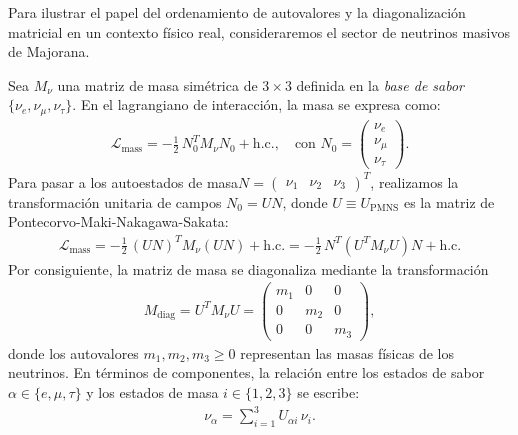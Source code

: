 \documentclass[12pt]{article}
\begin{document}
\newpage
\begin{cajaflex}

Para ilustrar el papel del ordenamiento de autovalores y la diagonalización 
matricial en un contexto físico real, 
consideraremos el sector de neutrinos masivos de Majorana. 

Sea $M_\nu$ una matriz de masa simétrica de $3 \times 3$ definida en la 
\textit{base de sabor} 
$ \{\nu_e, \nu_\mu, \nu_\tau\}$. 
En el lagrangiano de interacción, la masa se expresa como:
%
\begin{align*}
   \mathcal{L}_{\text{mass}} = -\frac{1}{2} \, N_0^T M_\nu N_0 + \text{h.c.}, \quad \text{con } 
   N_0 = \begin{pmatrix} \nu_e \\ \nu_\mu \\ \nu_\tau \end{pmatrix}.
\end{align*}
%
Para pasar a los autoestados de masa$N = \begin{pmatrix} \nu_1 & \nu_2 & \nu_3 \end{pmatrix}^T$,
realizamos la transformación unitaria de campos $N_0 = U N$, donde $U \equiv U_{\text{PMNS}}$ es la matriz de Pontecorvo-Maki-Nakagawa-Sakata:
%
\begin{align*}
   \mathcal{L}_{\text{mass}} = -\frac{1}{2} \, (U N)^T M_\nu (U N) + \text{h.c.} = -\frac{1}{2} \, N^T \left( U^T M_\nu U \right) N + \text{h.c.}
\end{align*}
%
Por consiguiente, la matriz de masa se diagonaliza mediante la transformación 
%
\begin{align*}
   M_{\text{diag}} = U^T M_\nu U = \begin{pmatrix} m_1 & 0 & 0 \\ 0 & m_2 & 0 \\ 0 & 0 & m_3 \end{pmatrix},
\end{align*}
%
donde los autovalores $m_1, m_2, m_3 \ge 0$ representan las masas físicas de los neutrinos. En términos de componentes, la relación entre los estados de sabor $\alpha \in \{e, \mu, \tau\}$ y los estados de masa $i \in \{1, 2, 3\}$ se escribe:
%
\begin{align*}
   \nu_\alpha = \sum_{i=1}^3 U_{\alpha i} \, \nu_i.
\end{align*}


\end{cajaflex}
\end{document}
